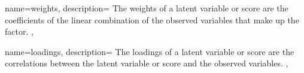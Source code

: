  {
    name={weights},
    description={
        The weights of a latent variable or score are the coefficients of the linear combination of the observed variables that make up the factor.
    },
}

 {
    name={loadings},
    description={
        The loadings of a latent variable or score are the correlations between the latent variable or score and the observed variables.
    },
}